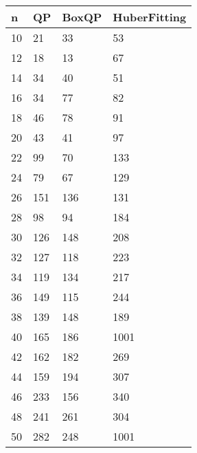 \begin{tabular}{llll}
n & QP & BoxQP & HuberFitting \\ 
\hline 
10 & 21 & 33 & 53 \\ 
12 & 18 & 13 & 67 \\ 
14 & 34 & 40 & 51 \\ 
16 & 34 & 77 & 82 \\ 
18 & 46 & 78 & 91 \\ 
20 & 43 & 41 & 97 \\ 
22 & 99 & 70 & 133 \\ 
24 & 79 & 67 & 129 \\ 
26 & 151 & 136 & 131 \\ 
28 & 98 & 94 & 184 \\ 
30 & 126 & 148 & 208 \\ 
32 & 127 & 118 & 223 \\ 
34 & 119 & 134 & 217 \\ 
36 & 149 & 115 & 244 \\ 
38 & 139 & 148 & 189 \\ 
40 & 165 & 186 & 1001 \\ 
42 & 162 & 182 & 269 \\ 
44 & 159 & 194 & 307 \\ 
46 & 233 & 156 & 340 \\ 
48 & 241 & 261 & 304 \\ 
50 & 282 & 248 & 1001 \\ 
\hline 
\end{tabular}